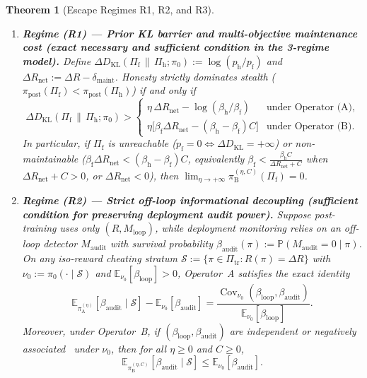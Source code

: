 \documentclass[11pt,a4paper]{article}
\newtheorem{theorem}{Theorem}
\newcommand{\E}{\mathbb{E}}
\newcommand{\Prob}{\mathbb{P}}
\newcommand{\Cov}{\operatorname{Cov}}
\newcommand{\DKL}{D_{\mathrm{KL}}}
\begin{document}
\begin{theorem}[Escape Regimes R1, R2, and R3]\label{thm:escape}
\leavevmode
\begin{enumerate}
  \item \textbf{Regime (R1) --- Prior KL barrier and multi-objective maintenance cost (exact necessary and sufficient condition in the 3-regime model).} Define $\Delta \DKL(\Pi_{\mathrm{f}} \,\|\, \Pi_{\mathrm{h}}; \pi_0) := \log(p_{\mathrm{h}}/p_{\mathrm{f}})$ and $\Delta R_{\mathrm{net}} := \Delta R - \delta_{\mathrm{maint}}$. Honesty strictly dominates stealth ($\pi_{\mathrm{post}}(\Pi_{\mathrm{f}}) < \pi_{\mathrm{post}}(\Pi_{\mathrm{h}})$) if and only if
  \begin{equation}\label{eq:R1}
    \Delta \DKL(\Pi_{\mathrm{f}} \,\|\, \Pi_{\mathrm{h}}; \pi_0) >
    \begin{cases}
      \eta\,\Delta R_{\mathrm{net}} - \log(\beta_{\mathrm{h}}/\beta_{\mathrm{f}}) & \text{under Operator~(A)}, \\[4pt]
      \eta\big[\beta_{\mathrm{f}}\Delta R_{\mathrm{net}} - (\beta_{\mathrm{h}} - \beta_{\mathrm{f}})C\big] & \text{under Operator~(B)}.
    \end{cases}
  \end{equation}
  In particular, if $\Pi_{\mathrm{f}}$ is unreachable ($p_{\mathrm{f}} = 0 \iff \Delta \DKL = +\infty$) or non-maintainable ($\beta_{\mathrm{f}}\Delta R_{\mathrm{net}} < (\beta_{\mathrm{h}} - \beta_{\mathrm{f}})C$, equivalently $\beta_{\mathrm{f}} < \frac{\beta_{\mathrm{h}} C}{\Delta R_{\mathrm{net}} + C}$ when $\Delta R_{\mathrm{net}} + C > 0$, or $\Delta R_{\mathrm{net}} < 0$), then $\lim_{\eta \to +\infty}\pi_{\mathrm{B}}^{(\eta, C)}(\Pi_{\mathrm{f}}) = 0$.

  \item \textbf{Regime (R2) --- Strict off-loop informational decoupling (sufficient condition for preserving deployment audit power).} Suppose post-training uses only $(R, M_{\mathrm{loop}})$, while deployment monitoring relies on an off-loop detector $M_{\mathrm{audit}}$ with survival probability $\beta_{\mathrm{audit}}(\pi) := \Prob(M_{\mathrm{audit}} = 0 \mid \pi)$. On any iso-reward cheating stratum $\mathcal{S} := \{\pi \in \Pi_{\mathrm{tr}} : R(\pi) = \Delta R\}$ with $\nu_0 := \pi_0(\cdot \mid \mathcal{S})$ and $\E_{\nu_0}[\beta_{\mathrm{loop}}] > 0$, Operator~A satisfies the exact identity
  \begin{equation}\label{eq:R2}
    \E_{\pi_{\mathrm{A}}^{(\eta)}}[\beta_{\mathrm{audit}} \mid \mathcal{S}] - \E_{\nu_0}[\beta_{\mathrm{audit}}]
    = \frac{\Cov_{\nu_0}(\beta_{\mathrm{loop}}, \beta_{\mathrm{audit}})}{\E_{\nu_0}[\beta_{\mathrm{loop}}]}.
  \end{equation}
  Moreover, under Operator~B, if $(\beta_{\mathrm{loop}}, \beta_{\mathrm{audit}})$ are independent or negatively associated~\cite{joagdev1983} under $\nu_0$, then for all $\eta \ge 0$ and $C \ge 0$,
  \begin{equation}
    \E_{\pi_{\mathrm{B}}^{(\eta, C)}}[\beta_{\mathrm{audit}} \mid \mathcal{S}] \le \E_{\nu_0}[\beta_{\mathrm{audit}}].
  \end{equation}


\end{enumerate}
\end{theorem}
\end{document}
